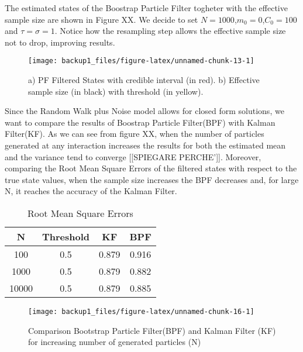 \documentclass[
]{book}
\theoremstyle{break}
\theoremstyle{nonumberplain}
\begin{document}
The estimated states of the Boostrap Particle Filter togheter with the
effective sample size are shown in Figure XX. We decide to set
\(N=1000\),\(m_{0}=0\),\(C_{0}=100\) and \(\tau=\sigma=1\). Notice how
the resampling step allows the effective sample size not to drop,
improving results.

\begin{figure}[H]

{\centering \texttt{[image: backup1\_files/figure-latex/unnamed-chunk-13-1]} 

}

\caption{a) PF Filtered States with credible interval (in red). b) Effective sample size (in black) with threshold (in yellow).}\label{fig:unnamed-chunk-13}
\end{figure}

Since the Random Walk plus Noise model allows for closed form solutions,
we want to compare the results of Boostrap Particle Filter(BPF) with
Kalman Filter(KF). As we can see from figure XX, when the number of
particles generated at any interaction increases the results for both
the estimated mean and the variance tend to converge {[}{[}SPIEGARE
PERCHE'{]}{]}. Moreover, comparing the Root Mean Square Errors of the
filtered states with respect to the true state values, when the sample
size increases the BPF decreases and, for large N, it reaches the
accuracy of the Kalman Filter.

\begin{longtable}[t]{cccc}
\caption{\label{tab:unnamed-chunk-15}Root Mean Square Errors}\\
\toprule
N & Threshold & KF & BPF\\
\midrule
100 & 0.5 & 0.879 & 0.916\\
1000 & 0.5 & 0.879 & 0.882\\
10000 & 0.5 & 0.879 & 0.885\\
\bottomrule
\end{longtable}

\begin{figure}[H]

{\centering \texttt{[image: backup1\_files/figure-latex/unnamed-chunk-16-1]} 

}

\caption{Comparison Bootstrap Particle Filter(BPF) and Kalman Filter (KF) for increasing number of generated particles (N)}\label{fig:unnamed-chunk-16}
\end{figure}

\hfill\break
\end{document}
